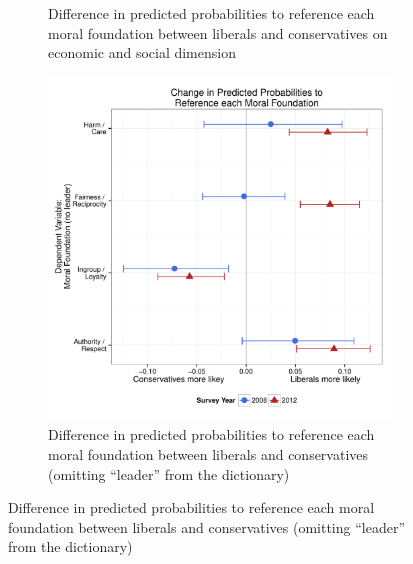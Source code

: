 \documentclass[12pt]{article}
\begin{document}
\begin{figure}[h]
\begin{subfigure}[t]{0.49\textwidth}
    \caption{Difference in predicted probabilities to reference each moral foundation between liberals and conservatives on economic and social dimension}\label{fig:appD2soceco}
  \end{subfigure}
  \begin{subfigure}[t]{0.49\textwidth}
    \includegraphics[scale=.35]{../calc/fig/appD3lead.pdf}
    \caption{Difference in predicted probabilities to reference each moral foundation between liberals and conservatives (omitting ``leader'' from the dictionary)}\label{fig:appD3lead}
  \end{subfigure}
\end{figure}
\end{document}
